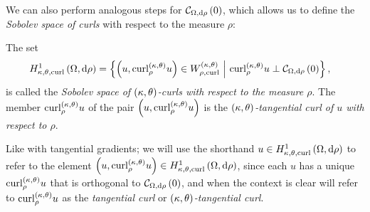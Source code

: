 We can also perform analogous steps for $\curlZero{\ddom}{\rho}$, which allows us to define the \emph{Sobolev space of curls} with respect to the measure $\rho$:
\begin{definition} \label{def:CurlSobSpace}
	The set
	\begin{align*}
		\ktcurlSob{\ddom}{\rho} &= \clbracs{ \bracs{u, \ktcurl{\rho}u}\in W^{\kt}_{\rho,\mathrm{curl}} \setVert \ktcurl{\rho}u \perp \curlZero{\ddom}{\rho} },
	\end{align*}
	is called the \emph{Sobolev space of $\kt$-curls with respect to the measure $\rho$}.
	The member $\ktcurl{\rho}u$ of the pair $\bracs{u, \ktcurl{\rho}u}$ is the \emph{$\kt$-tangential curl of $u$ with respect to $\rho$}.
\end{definition}
Like with tangential gradients; we will use the shorthand $u\in\ktcurlSob{\ddom}{\rho}$ to refer to the element $\bracs{u, \ktcurl{\rho}u}\in\ktcurlSob{\ddom}{\rho}$, since each $u$ has a unique $\ktcurl{\rho}u$ that is orthogonal to $\curlZero{\ddom}{\rho}$, and when the context is clear will refer to $\ktcurl{\rho}u$ as the \emph{tangential curl} or \emph{$\kt$-tangential curl}.



